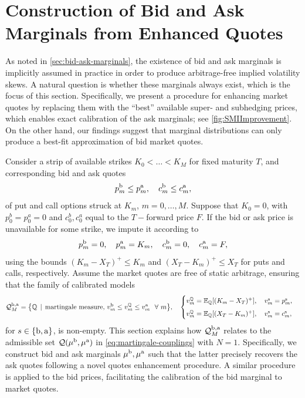 \documentclass[11pt]{article}
\newcommand{\cQ}{\mathcal{Q}}
\newcommand{\Q}{\mathbb{Q}} %
\theoremstyle{plain}
\theoremstyle{definition}
\theoremstyle{remark}
\newcommand{\E}{\mathbb{E}}
\theoremstyle{plain}
\begin{document}
%

%
%
%
%
%
%
%



%
\appendix

%




\section{Construction of Bid and Ask Marginals from Enhanced Quotes} \label{sec:existenceBidAsk}

As noted in \cref{sec:bid-ask-marginals}, the existence of bid and ask marginals is implicitly assumed in practice in order to produce arbitrage-free implied volatility skews. A natural question is whether these marginals always exist, which is the focus of this section.  
Specifically, we present a procedure for enhancing market quotes by replacing them with the ``best” available super- and subhedging prices, which enables exact calibration of the ask marginals; see \cref{fig:SMIImprovement}.
On the other hand, our findings suggest that marginal distributions can  only produce a best-fit approximation of bid market quotes.



%
%
%


Consider a strip of  available strikes $K_0 < \ldots < K_M$ for  fixed maturity $T$,  and corresponding   bid and ask quotes 
$$p^{\rm b}_m \le p^{\rm a}_m, \quad c^{\rm b}_m \le c^{\rm a}_m, $$  
of put  and call  options struck at $K_m$, $m=0,\ldots,M$. %
Suppose that $K_0 = 0$, with $p_0^b = p_0^a = 0$ and $c_0^b, c_0^a $ equal to the  $T-$forward price $F$.     If  the bid or ask price is unavailable for some strike, we impute it according to 
$$p^{\rm b}_m = 0,  \quad p^{\rm a}_m = K_m, \quad  c^{\rm b}_m = 0, \quad c^{\rm a}_m = F,$$
using the bounds $ (K_m-X_T)^+ \le K_m$ and $ (X_T-K_m)^+ \le X_T$ for puts and calls, respectively. Assume the market quotes are free of static arbitrage, ensuring that the family  of calibrated models
\begin{equation*}\label{eq:discreteAdmissibleSet}
 \cQ_M^{\rm b,a} = \big\{\Q  \, \mid \,   \text{martingale measure, }   v_m^{\rm b} \le v_m^\Q \le v_m^{\rm a} \ \ \forall \ m \big\}, \quad   \begin{cases}v_m^{\Q} = \E_{\Q}[(K_m - X_T)^+], \quad v_m^{\rm s} = p_m^{\rm s}, \\[0.5em]
 v_m^{\Q} =\E_{\Q}[(X_T-K_m)^+], \quad v_m^{\rm s} = c_m^{\rm s}, 
 \end{cases}
\end{equation*}
%
%
%
%
%
for $ s\in \{{\rm b, \rm a}\}$, 
is non-empty. This section explains how $ \cQ_M^{\rm b,a}$ relates to the admissible set $\cQ(\mu^{\rm b},\mu^{\rm a})$   in \eqref{eq:martingale-couplings} with $N=1$. Specifically, we construct bid and ask marginals $\mu^{\rm b},\mu^{\rm a}$ such that the latter precisely recovers the ask quotes following a novel quotes enhancement procedure. A similar procedure is applied  to the bid prices, facilitating the calibration of the bid marginal to market quotes. 
\end{document}
